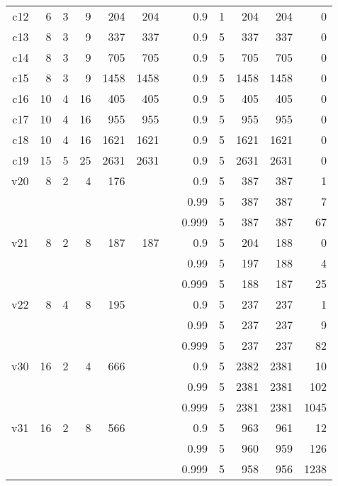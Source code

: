 \documentclass[a4paper,11pt]{article}
\begin{document}
\begin{table}
\begin{tabular}{@{\bfseries}rrrrrrrrrrrr}
	c12  &  6 &  3 &  9 &  204 &  204 &&    0.9 & 1 &  204 &  204 &    0 \\
	c13  &  8 &  3 &  9 &  337 &  337 &&    0.9 & 5 &  337 &  337 &    0 \\
	c14  &  8 &  3 &  9 &  705 &  705 &&    0.9 & 5 &  705 &  705 &    0 \\
	c15  &  8 &  3 &  9 & 1458 & 1458 &&    0.9 & 5 & 1458 & 1458 &    0 \\
	c16  & 10 &  4 & 16 &  405 &  405 &&    0.9 & 5 &  405 &  405 &    0 \\
	c17  & 10 &  4 & 16 &  955 &  955 &&    0.9 & 5 &  955 &  955 &    0 \\
	c18  & 10 &  4 & 16 & 1621 & 1621 &&    0.9 & 5 & 1621 & 1621 &    0 \\
	c19  & 15 &  5 & 25 & 2631 & 2631 &&    0.9 & 5 & 2631 & 2631 &    0 \\[1ex]
	v20  &  8 &  2 &  4 &  176 &      &&    0.9 & 5 &  387 &  387 &    1 \\
	     &    &    &    &      &      &&   0.99 & 5 &  387 &  387 &    7 \\
	     &    &    &    &      &      &&  0.999 & 5 &  387 &  387 &   67 \\[1ex]
	v21  &  8 &  2 &  8 &  187 &  187 &&    0.9 & 5 &  204 &  188 &    0 \\
	     &    &    &    &      &      &&   0.99 & 5 &  197 &  188 &    4 \\
	     &    &    &    &      &      &&  0.999 & 5 &  188 &  187 &   25 \\[1ex]
	v22  &  8 &  4 &  8 &  195 &      &&    0.9 & 5 &  237 &  237 &    1 \\
	     &    &    &    &      &      &&   0.99 & 5 &  237 &  237 &    9 \\
	     &    &    &    &      &      &&  0.999 & 5 &  237 &  237 &   82 \\[1ex]
	v30  & 16 &  2 &  4 &  666 &      &&    0.9 & 5 & 2382 & 2381 &   10 \\
	     &    &    &    &      &      &&   0.99 & 5 & 2381 & 2381 &  102 \\
	     &    &    &    &      &      &&  0.999 & 5 & 2381 & 2381 & 1045 \\[1ex]
	v31  & 16 &  2 &  8 &  566 &      &&    0.9 & 5 &  963 &  961 &   12 \\
	     &    &    &    &      &      &&   0.99 & 5 &  960 &  959 &  126 \\
	     &    &    &    &      &      &&  0.999 & 5 &  958 &  956 & 1238 \\[1ex]

\end{tabular}
\end{table}
\end{document}
